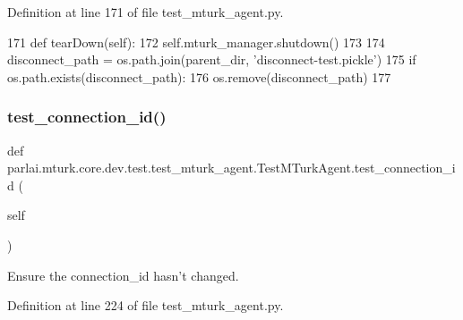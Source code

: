 Definition at line 171 of file test\+\_\+mturk\+\_\+agent.\+py.


\begin{DoxyCode}
171     \textcolor{keyword}{def }tearDown(self):
172         self.mturk\_manager.shutdown()
173 
174         disconnect\_path = os.path.join(parent\_dir, \textcolor{stringliteral}{'disconnect-test.pickle'})
175         \textcolor{keywordflow}{if} os.path.exists(disconnect\_path):
176             os.remove(disconnect\_path)
177 
\end{DoxyCode}
\mbox{\label{classparlai_1_1mturk_1_1core_1_1dev_1_1test_1_1test__mturk__agent_1_1TestMTurkAgent_a978ff70bb9e6e752c06f5c6db8e63d52}} 
\subsubsection{\texorpdfstring{test\+\_\+connection\+\_\+id()}{test\_connection\_id()}}
{\footnotesize\ttfamily def parlai.\+mturk.\+core.\+dev.\+test.\+test\+\_\+mturk\+\_\+agent.\+Test\+M\+Turk\+Agent.\+test\+\_\+connection\+\_\+id (\begin{DoxyParamCaption}\item[{}]{self }\end{DoxyParamCaption})}

\begin{DoxyVerb}Ensure the connection_id hasn't changed.
\end{DoxyVerb}
 

Definition at line 224 of file test\+\_\+mturk\+\_\+agent.\+py.


